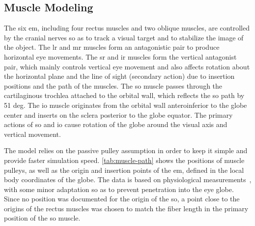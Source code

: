 \documentclass[11pt,a4paper,draft=false]{report}
\begin{document}
\subsection*{Muscle Modeling}\label{sec:muscle-modeling}

The six \gls{em}, including four rectus muscles and two oblique muscles, are
controlled by the cranial nerves so as to track a visual target and to stabilize
the image of the object. The \gls{lr} and \gls{mr} muscles form an antagonistic
pair to produce horizontal eye movements. The \gls{sr} and \gls{ir} muscles form
the vertical antagonist pair, which mainly controls vertical eye movement and
also affects rotation about the horizontal plane and the line of sight
(secondary action) due to insertion positions and the path of the muscles. The
\gls{so} muscle passes through the cartilaginous trochlea attached to the
orbital wall, which reflects the \gls{so} path by 51 deg. The \gls{io} muscle
originates from the orbital wall anteroinferior to the globe center and inserts
on the sclera posterior to the globe equator. The primary actions of \gls{so}
and \gls{io} cause rotation of the globe around the visual axis and vertical
movement.

The model relies on the passive pulley assumption in order to keep it simple and
provide faster simulation speed. \autoref{tab:muscle-path} shows the positions
of muscle pulleys, as well as the origin and insertion points of the \gls{em},
defined in the local body coordinates of the globe. The data is based on
physiological measurements~\cite{Iskander2018}, with some minor adaptation so as
to prevent penetration into the eye globe. Since no position was documented for
the origin of the \gls{so}, a point close to the origins of the rectus muscles
was chosen to match the fiber length in the primary position of the \gls{so}
muscle.
\end{document}
